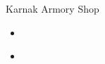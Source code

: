 \begin{paracol}{2}
\begin{shop}{Karnak Armory Shop}
    \varwb
    \begin{itemize}
        \item {}
    \end{itemize}
    \begin{buy}
        \item {} \silkRobe \space {}
    \end{buy}
    \begin{itemize}
        \item {}
    \end{itemize}
    \begin{buy}
        \item {} \mythrilKnife \space {}
        \item {} \fireRod \space {}
        \item {} \iceRod \space {}
        \item {} \thunderRod \space {}
    \end{buy}
    \varwe
\end{shop}    

\end{paracol}